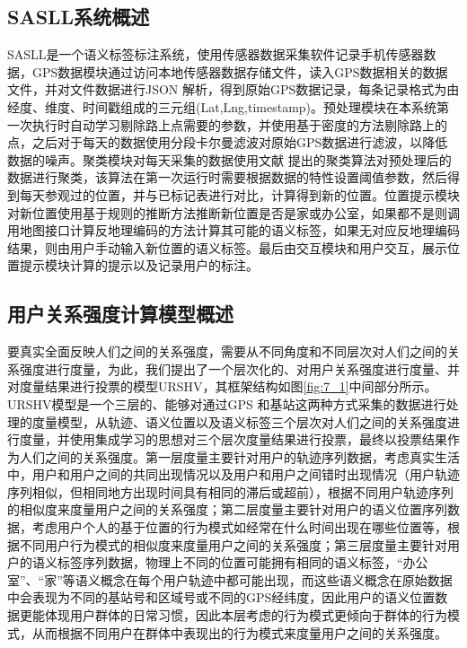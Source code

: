 \subsection{SASLL系统概述}
SASLL是一个语义标签标注系统，使用传感器数据采集软件记录手机传感器数据，GPS数据模块通过访问本地传感器数据存储文件，读入GPS数据相关的数据文件，并对文件数据进行JSON 解析，得到原始GPS数据记录，每条记录格式为由经度、维度、时间戳组成的三元组(Lat,Lng,timestamp)。预处理模块在本系统第一次执行时自动学习剔除路上点需要的参数，并使用基于密度的方法剔除路上的点，之后对于每天的数据使用分段卡尔曼滤波对原始GPS数据进行滤波，以降低数据的噪声。聚类模块对每天采集的数据使用文献\cite{rodriguez2014clustering} 提出的聚类算法对预处理后的数据进行聚类，该算法在第一次运行时需要根据数据的特性设置阈值参数，然后得到每天参观过的位置，并与已标记表进行对比，计算得到新的位置。位置提示模块对新位置使用基于规则的推断方法推断新位置是否是家或办公室，如果都不是则调用地图接口计算反地理编码的方法计算其可能的语义标签，如果无对应反地理编码结果，则由用户手动输入新位置的语义标签。最后由交互模块和用户交互，展示位置提示模块计算的提示以及记录用户的标注。
\subsection{用户关系强度计算模型概述}
要真实全面反映人们之间的关系强度，需要从不同角度和不同层次对人们之间的关系强度进行度量，为此，我们提出了一个层次化的、对用户关系强度进行度量、并对度量结果进行投票的模型URSHV，其框架结构如图\ref{fig:7_1}中间部分所示。URSHV模型是一个三层的、能够对通过GPS 和基站这两种方式采集的数据进行处理的度量模型，从轨迹、语义位置以及语义标签三个层次对人们之间的关系强度进行度量，并使用集成学习的思想对三个层次度量结果进行投票，最终以投票结果作为人们之间的关系强度。第一层度量主要针对用户的轨迹序列数据，考虑真实生活中，用户和用户之间的共同出现情况以及用户和用户之间错时出现情况（用户轨迹序列相似，但相同地方出现时间具有相同的滞后或超前），根据不同用户轨迹序列的相似度来度量用户之间的关系强度；第二层度量主要针对用户的语义位置序列数据，考虑用户个人的基于位置的行为模式如经常在什么时间出现在哪些位置等，根据不同用户行为模式的相似度来度量用户之间的关系强度；第三层度量主要针对用户的语义标签序列数据，物理上不同的位置可能拥有相同的语义标签，“办公室”、“家”等语义概念在每个用户轨迹中都可能出现，而这些语义概念在原始数据中会表现为不同的基站号和区域号或不同的GPS经纬度，因此用户的语义位置数据更能体现用户群体的日常习惯，因此本层考虑的行为模式更倾向于群体的行为模式，从而根据不同用户在群体中表现出的行为模式来度量用户之间的关系强度。
